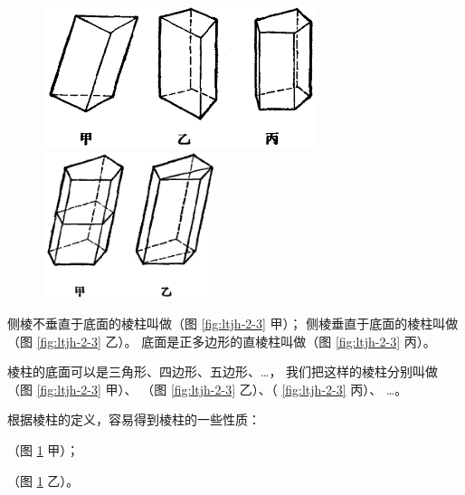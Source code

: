 \begin{figure}[htbp]
    \centering
    \begin{minipage}[b]{9cm}
        \centering
        \includegraphics[width=8cm]{../pic/ltjh-ch2-03.png}
        \caption{}\label{fig:ltjh-2-3}
    \end{minipage}
    \qquad
    \begin{minipage}[b]{5cm}
        \centering
        \includegraphics[width=5cm]{../pic/ltjh-ch2-04.png}
        \caption{}\label{fig:ltjh-2-4}
    \end{minipage}
\end{figure}

侧棱不垂直于底面的棱柱叫做（图 \ref{fig:ltjh-2-3} 甲）；
侧棱垂直于底面的棱柱叫做（图 \ref{fig:ltjh-2-3} 乙）。
底面是正多边形的直棱柱叫做（图 \ref{fig:ltjh-2-3} 丙）。

棱柱的底面可以是三角形、四边形、五边形、…，
我们把这样的棱柱分别叫做（图 \ref{fig:ltjh-2-3} 甲）、
（图 \ref{fig:ltjh-2-3} 乙）、（ \ref{fig:ltjh-2-3} 丙）、 …。

根据棱柱的定义，容易得到棱柱的一些性质：


（图 \ref{fig:ltjh-2-4} 甲）；

（图 \ref{fig:ltjh-2-4} 乙）。


\begin{lianxi}




\end{lianxi}



